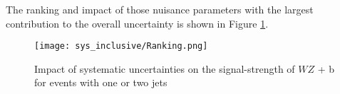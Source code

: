 The ranking and impact of those nuisance parameters with the largest contribution to the overall uncertainty is shown in Figure \ref{fig:ranking_inc}.

\begin{figure}[H]
    \centering
    \texttt{[image: sys\_inclusive/Ranking.png]}
    \caption{Impact of systematic uncertainties on the signal-strength of $WZ$ + b for events with one or two jets}
    \label{fig:ranking_inc}
\end{figure}


